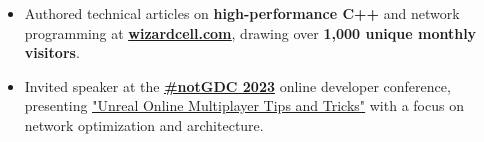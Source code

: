 

\begin{cvparagraph}

\begin{itemize}[leftmargin=*]
  \item Authored technical articles on \textbf{high-performance C++} and network programming at \href{https://wizardcell.com/}{\underline{\textbf{wizardcell.com}}}, drawing over \textbf{1,000 unique monthly visitors}.
  \item Invited speaker at the \href{https://notgdc.io/2023/}{\underline{\textbf{\#notGDC 2023}}} online developer conference, presenting \href{https://youtu.be/ja9lhOjgmqY}{\underline{"Unreal Online Multiplayer Tips and Tricks"}} with a focus on network optimization and architecture.
\end{itemize}

\end{cvparagraph}